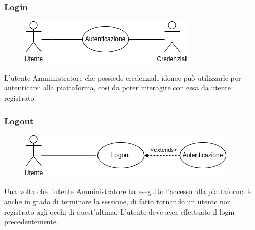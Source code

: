 \documentclass{article}
\begin{document}
\subsubsection{Login}\label{rf_5}
\begin{description}
	
	\begin{figure}[htp]
		\centering
		\includegraphics[]{rf5.png}
	\end{figure}
	
	\item L'utente Amministratore che possiede credenziali idonee può utilizzarle per autenticarsi alla piattaforma, così da poter interagire con essa da utente registrato.
\end{description}

\renewcommand\thesubsubsection{RF 6}
\subsubsection{Logout}\label{rf_6}
\begin{description}
	
	\begin{figure}[htp]
		\centering
		\includegraphics[]{rf6.png}
	\end{figure}
	
	\item Una volta che l'utente Amministratore ha eseguito l'accesso alla piattaforma è anche in grado di terminare la sessione, di fatto tornando un utente non registrato agli occhi di quest'ultima. L'utente deve aver effettuato il login precedentemente. 
\end{description}

\renewcommand\thesubsubsection{RF 7}
\end{document}
